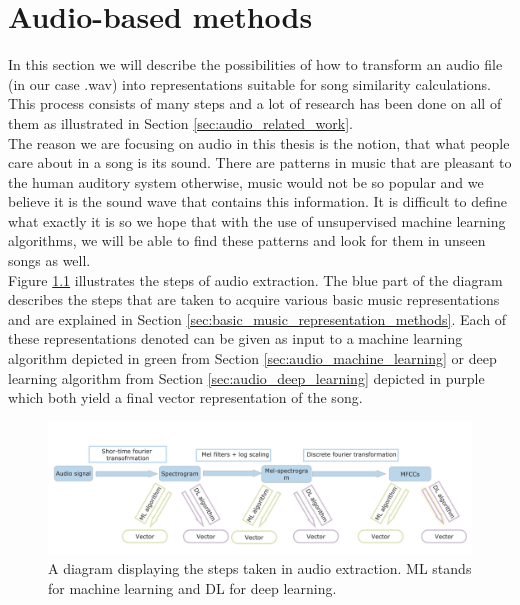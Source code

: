 \chapter{Audio-based methods}
In this section we will describe the possibilities of how to transform an audio file (in our case .wav) into representations suitable for song similarity calculations. This process consists of many steps and a lot of research has been done on all of them as illustrated in Section \ref{sec:audio_related_work}. \\
The reason we are focusing on audio in this thesis is the notion, that what people care about in a song is its sound. There are patterns in music that are pleasant to the human auditory system otherwise, music would not be so popular and we believe it is the sound wave that contains this information. It is difficult to define what exactly it is so we hope that with the use of unsupervised machine learning algorithms, we will be able to find these patterns and look for them in unseen songs as well. \\

Figure \ref{fig:audio_extraction} illustrates the steps of audio extraction. The blue part of the diagram describes the steps that are taken to acquire various basic music representations and are explained in Section \ref{sec:basic_music_representation_methods}. Each of these representations denoted can be given as input to a machine learning algorithm depicted in green from Section \ref{sec:audio_machine_learning} or deep learning algorithm from Section \ref{sec:audio_deep_learning} depicted in purple which both yield a final vector representation of the song. \\

\begin{figure}[h!]
    \centering
	\includegraphics[width=140mm]{./img/audio_feature_extraction_steps.png}
	\caption{A diagram displaying the steps taken in audio extraction. ML stands for machine learning and DL for deep learning.}
	\label{fig:audio_extraction}
\end{figure}

